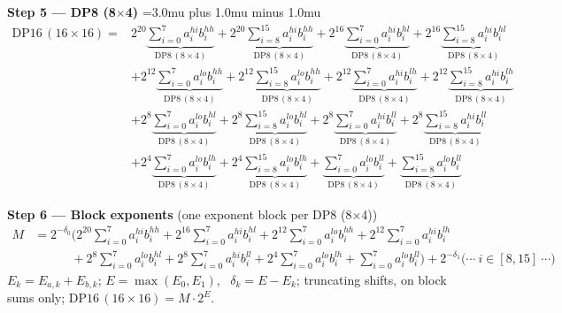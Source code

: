 \documentclass[fleqn]{article}
\newcommand{\DPop}[3]{\mathrm{DP#1}\,(#2\!\times\!#3)}
\begin{document}
\textbf{Step 5 --- DP8 (8$\times$4)}
{\medmuskip=3.0mu plus 1.0mu minus 1.0mu
\begin{align*}
\DPop{16}{16}{16} = {}
  & 2^{20} \underbrace{\sum_{i=0}^{7} a_i^{hi} b_i^{hh}}_{\DPop{8}{8}{4}}
  + 2^{20} \underbrace{\sum_{i=8}^{15} a_i^{hi} b_i^{hh}}_{\DPop{8}{8}{4}}
  + 2^{16} \underbrace{\sum_{i=0}^{7} a_i^{hi} b_i^{hl}}_{\DPop{8}{8}{4}}
  + 2^{16} \underbrace{\sum_{i=8}^{15} a_i^{hi} b_i^{hl}}_{\DPop{8}{8}{4}} \\[1em]
  & + 2^{12} \underbrace{\sum_{i=0}^{7} a_i^{lo} b_i^{hh}}_{\DPop{8}{8}{4}}
  + 2^{12} \underbrace{\sum_{i=8}^{15} a_i^{lo} b_i^{hh}}_{\DPop{8}{8}{4}}
  + 2^{12} \underbrace{\sum_{i=0}^{7} a_i^{hi} b_i^{lh}}_{\DPop{8}{8}{4}}
  + 2^{12} \underbrace{\sum_{i=8}^{15} a_i^{hi} b_i^{lh}}_{\DPop{8}{8}{4}} \\[1em]
  & + 2^{8} \underbrace{\sum_{i=0}^{7} a_i^{lo} b_i^{hl}}_{\DPop{8}{8}{4}}
  + 2^{8} \underbrace{\sum_{i=8}^{15} a_i^{lo} b_i^{hl}}_{\DPop{8}{8}{4}}
  + 2^{8} \underbrace{\sum_{i=0}^{7} a_i^{hi} b_i^{ll}}_{\DPop{8}{8}{4}}
  + 2^{8} \underbrace{\sum_{i=8}^{15} a_i^{hi} b_i^{ll}}_{\DPop{8}{8}{4}} \\[1em]
  & + 2^{4} \underbrace{\sum_{i=0}^{7} a_i^{lo} b_i^{lh}}_{\DPop{8}{8}{4}}
  + 2^{4} \underbrace{\sum_{i=8}^{15} a_i^{lo} b_i^{lh}}_{\DPop{8}{8}{4}}
  + \underbrace{\sum_{i=0}^{7} a_i^{lo} b_i^{ll}}_{\DPop{8}{8}{4}}
  + \underbrace{\sum_{i=8}^{15} a_i^{lo} b_i^{ll}}_{\DPop{8}{8}{4}}
\end{align*}
}

\textbf{Step 6 --- Block exponents}\quad
{\small(one exponent block per DP8 (8$\times$4))}
\begin{align*}
M &= 2^{-\delta_0}\Big( 2^{20}\!\sum_{i=0}^{7} a_i^{hi} b_i^{hh} + 2^{16}\!\sum_{i=0}^{7} a_i^{hi} b_i^{hl} + 2^{12}\!\sum_{i=0}^{7} a_i^{lo} b_i^{hh} + 2^{12}\!\sum_{i=0}^{7} a_i^{hi} b_i^{lh} \\
  &\qquad\quad + 2^{8}\!\sum_{i=0}^{7} a_i^{lo} b_i^{hl} + 2^{8}\!\sum_{i=0}^{7} a_i^{hi} b_i^{ll} + 2^{4}\!\sum_{i=0}^{7} a_i^{lo} b_i^{lh} + \sum_{i=0}^{7} a_i^{lo} b_i^{ll} \Big)
  + 2^{-\delta_1}\Big(\cdots\ i\!\in\![8,15]\ \cdots\Big)
\end{align*}
$E_k=E_{a,k}+E_{b,k}$; \quad $E=\max(E_0,E_1)$, \ $\delta_k=E-E_k$; \quad truncating shifts, on block sums only; \quad $\DPop{16}{16}{16}=M\cdot2^{E}$.
\end{document}
